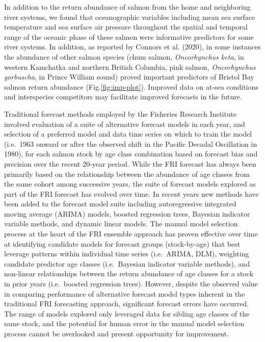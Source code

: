 \documentclass[
]{article}
\begin{document}
In addition to the return abundance of salmon from the home and neighboring river systems, we found that oceanographic variables including mean sea surface temperature and sea surface air pressure throughout the spatial and temporal range of the oceanic phase of these salmon were informative predictors for some river systems. In addition, as reported by Connors et al. (2020), in some instances the abundance of other salmon species (chum salmon, \emph{Oncorhynchus keta}, in western Kamchatka and northern British Columbia, pink salmon, \emph{Oncorhynchus gorbuscha}, in Prince William sound) proved important predictors of Bristol Bay salmon return abundance (Fig.\ref{fig:imp-plot}). Improved data on at-sea conditions and interspecies competitors may facilitate improved forecasts in the future.

Traditional forecast methods employed by the Fisheries Research Institute involved evaluation of a suite of alternative forecast models in each year, and selection of a preferred model and data time series on which to train the model (i.e.~1963 onward or after the observed shift in the Pacific Decadal Oscillation in 1980), for each salmon stock by age class combination based on forecast bias and precision over the recent 20-year period. While the FRI forecast has always been primarily based on the relationship between the abundance of age classes from the same cohort among successive years, the suite of forecast models explored as part of the FRI forecast has evolved over time. In recent years new methods have been added to the forecast model suite including autoregressive integrated moving average (ARIMA) models, boosted regression trees, Bayesian indicator variable methods, and dynamic linear models. The manual model selection process at the heart of the FRI ensemble approach has proven effective over time at identifying candidate models for forecast groups (stock-by-age) that best leverage patterns within individual time series (i.e.~ARIMA, DLM), weighting candidate predictor age classes (i.e.~Bayesian indicator variable methods), and non-linear relationships between the return abundance of age classes for a stock in prior years (i.e.~boosted regression trees). However, despite the observed value in comparing performance of alternative forecast model types inherent in the traditional FRI forecasting approach, significant forecast errors have occurred. The range of models explored only leveraged data for sibling age classes of the same stock, and the potential for human error in the manual model selection process cannot be overlooked and present opportunity for improvement.
\end{document}
